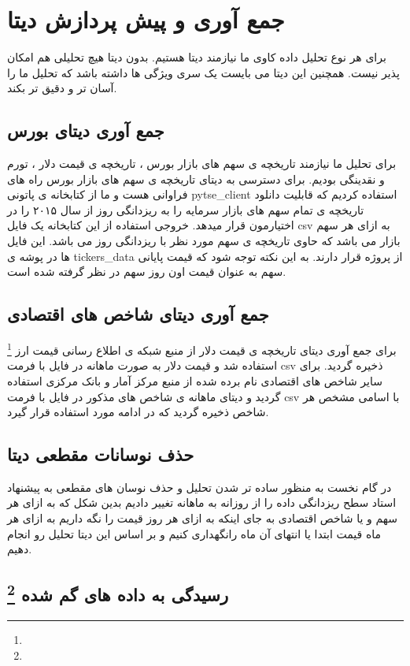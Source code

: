\documentclass[12pt]{report}
\begin{document}
\section{جمع آوری و پیش پردازش دیتا}
برای هر نوع تحلیل داده کاوی ما نیازمند دیتا هستیم. بدون دیتا هیچ تحلیلی هم امکان پذیر نیست. همچنین این دیتا می بایست یک سری ویژگی ها داشته باشد که تحلیل ما را آسان تر و دقیق تر بکند.
\subsection{جمع آوری دیتای بورس}
برای تحلیل  ما نیازمند تاریخچه ی سهم های بازار بورس ، تاریخچه ی قیمت دلار ، تورم و نقدینگی بودیم. برای دسترسی به دیتای تاریخچه ی سهم های بازار بورس راه های فراوانی هست و ما از کتابخانه ی پاتونی
pytse\_client 
استفاده کردیم که قابلیت دانلود تاریخچه ی تمام سهم های بازار سرمایه را به ریزدانگی روز از سال ۲۰۱۵ را در اختیارمون قرار میدهد. خروجی استفاده از این کتابخانه یک فایل csv به ازای هر سهم بازار می باشد که حاوی تاریخچه ی سهم مورد نظر با ریزدانگی روز می باشد.
این فایل ها در پوشه ی tickers\_data از پروژه قرار دارند.
 به این نکته توجه شود که قیمت پایانی سهم به عنوان قیمت اون روز سهم در نظر گرفته شده است.
\subsection{جمع آوری دیتای شاخص های اقتصادی}
برای جمع آوری دیتای تاریخچه ی قیمت دلار از 
منبع شبکه ی اطلاع رسانی قیمت ارز
\footnote{}
استفاده شد و قیمت دلار به صورت ماهانه در فایل با فرمت csv ذخیره گردید.
برای سایر شاخص های اقتصادی نام برده شده از منبع مرکز آمار و بانک مرکزی استفاده گردید و دیتای ماهانه ی شاخص های مذکور در فایل با فرمت csv با اسامی مشخص هر شاخص ذخیره گردید که در ادامه مورد استفاده قرار گیرد.

\subsection{ حذف نوسانات مقطعی دیتا}
در گام نخست به منظور ساده تر شدن تحلیل و حذف نوسان های مقطعی به پیشنهاد استاد سطح ریزدانگی داده را از روزانه به ماهانه تغییر دادیم بدین شکل که به ازای هر سهم و یا شاخص اقتصادی به جای اینکه به ازای هر روز قیمت را نگه داریم به ازای هر ماه قیمت ابتدا یا انتهای آن ماه رانگهداری کنیم و بر اساس این دیتا تحلیل رو انجام دهیم. 


\subsection{
رسیدگی به داده های 
گم شده
\footnote{}
}
\end{document}
